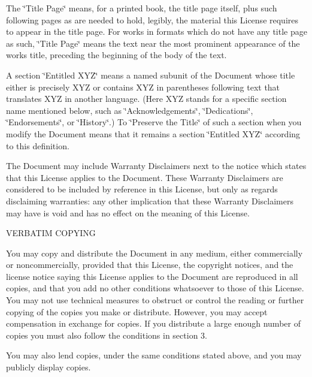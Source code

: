 The \char`\"{}\+Title Page\char`\"{} means, for a printed book, the title page itself, plus such following pages as are needed to hold, legibly, the material this License requires to appear in the title page. For works in formats which do not have any title page as such, \char`\"{}\+Title Page\char`\"{} means the text near the most prominent appearance of the work\textquotesingle{}s title, preceding the beginning of the body of the text.

A section \char`\"{}\+Entitled X\+Y\+Z\char`\"{} means a named subunit of the Document whose title either is precisely X\+YZ or contains X\+YZ in parentheses following text that translates X\+YZ in another language. (Here X\+YZ stands for a specific section name mentioned below, such as \char`\"{}\+Acknowledgements\char`\"{}, \char`\"{}\+Dedications\char`\"{}, \char`\"{}\+Endorsements\char`\"{}, or \char`\"{}\+History\char`\"{}.) To \char`\"{}\+Preserve the Title\char`\"{} of such a section when you modify the Document means that it remains a section \char`\"{}\+Entitled X\+Y\+Z\char`\"{} according to this definition.

The Document may include Warranty Disclaimers next to the notice which states that this License applies to the Document. These Warranty Disclaimers are considered to be included by reference in this License, but only as regards disclaiming warranties\+: any other implication that these Warranty Disclaimers may have is void and has no effect on the meaning of this License.


\begin{DoxyEnumerate}
\item V\+E\+R\+B\+A\+T\+IM C\+O\+P\+Y\+I\+NG
\end{DoxyEnumerate}

You may copy and distribute the Document in any medium, either commercially or noncommercially, provided that this License, the copyright notices, and the license notice saying this License applies to the Document are reproduced in all copies, and that you add no other conditions whatsoever to those of this License. You may not use technical measures to obstruct or control the reading or further copying of the copies you make or distribute. However, you may accept compensation in exchange for copies. If you distribute a large enough number of copies you must also follow the conditions in section 3.

You may also lend copies, under the same conditions stated above, and you may publicly display copies.


